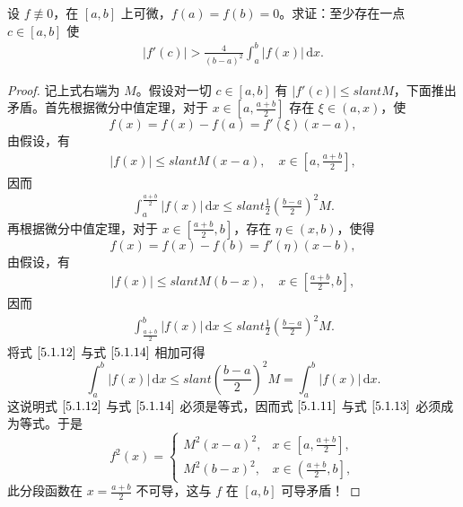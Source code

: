 \documentclass[../../main.tex]{subfiles}
\begin{document}
\begin{example}
设 \( f \not\equiv 0 \)，在 \( [a,b] \) 上可微，\( f(a) = f(b) = 0 \)。求证：至少存在一点 \( c \in [a,b] \) 使
\begin{align}
|f'(c)| > \frac{4}{(b - a)^2} \int_{a}^{b} |f(x)| \, \mathrm{d}x. \label{5.1.10}
\end{align}
\end{example}
\begin{proof}
记上式右端为 \( M \)。假设对一切 \( c \in [a,b] \) 有 \( |f'(c)| \leqslant slant M \)，下面推出矛盾。首先根据微分中值定理，对于 \( x \in \left[ a, \frac{a + b}{2} \right] \) 存在 \( \xi \in (a,x) \)，使
\[
f(x) = f(x) - f(a) = f'(\xi)(x - a),
\]
由假设，有
\begin{align}
|f(x)| \leqslant slant M(x - a), \quad x \in \left[ a, \frac{a + b}{2} \right], \label{5.1.11}
\end{align}
因而
\begin{align}
\int_{a}^{\frac{a + b}{2}} |f(x)| \, \mathrm{d}x \leqslant slant \frac{1}{2} \left( \frac{b - a}{2} \right)^2 M. \label{5.1.12}
\end{align}
再根据微分中值定理，对于 \( x \in \left[ \frac{a + b}{2}, b \right] \)，存在 \( \eta \in (x,b) \)，使得
\[
f(x) = f(x) - f(b) = f'(\eta)(x - b),
\]
由假设，有
\begin{align}
|f(x)| \leqslant slant M(b - x), \quad x \in \left[ \frac{a + b}{2}, b \right], \label{5.1.13}
\end{align}
因而
\begin{align}
\int_{\frac{a + b}{2}}^{b} |f(x)| \, \mathrm{d}x \leqslant slant \frac{1}{2} \left( \frac{b - a}{2} \right)^2 M. \label{5.1.14}
\end{align}
将式 \(\eqref{5.1.12}\) 与式 \(\eqref{5.1.14}\) 相加可得
\[
\int_{a}^{b} |f(x)| \, \mathrm{d}x \leqslant slant \left( \frac{b - a}{2} \right)^2 M = \int_{a}^{b} |f(x)| \, \mathrm{d}x.
\]
这说明式 \(\eqref{5.1.12}\) 与式 \(\eqref{5.1.14}\) 必须是等式，因而式 \(\eqref{5.1.11}\) 与式 \(\eqref{5.1.13}\) 必须成为等式。于是
\[
f^2(x) = 
\begin{cases} 
M^2(x - a)^2, & x \in \left[ a, \frac{a + b}{2} \right], \\
M^2(b - x)^2, & x \in \left( \frac{a + b}{2}, b \right], 
\end{cases}
\]
此分段函数在 \( x = \frac{a + b}{2} \) 不可导，这与 \( f \) 在 \([a,b]\) 可导矛盾！
\end{proof}
\end{document}
